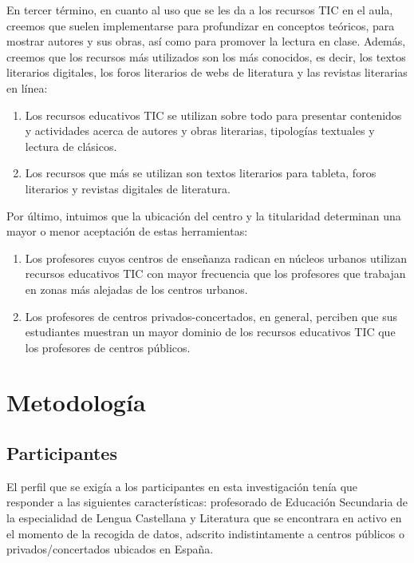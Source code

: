 \documentclass[spanish]{textolivre}
\begin{document}
En tercer término, en cuanto al uso que se les da a los recursos TIC en el aula, creemos que suelen implementarse para profundizar en conceptos teóricos, para mostrar autores y sus obras, así como para promover la lectura en clase. Además, creemos que los recursos más utilizados son los más conocidos, es decir, los textos literarios digitales, los foros literarios de webs de literatura y las revistas literarias en línea: 

\begin{enumerate}[label={H\arabic*},resume]
    \item\label{H9} Los recursos educativos TIC se utilizan sobre todo para presentar contenidos y actividades acerca de autores y obras literarias, tipologías textuales y lectura de clásicos.
   \item\label{H10}  Los recursos que más se utilizan son textos literarios para tableta, foros literarios y revistas digitales de literatura.
\end{enumerate}

Por último, intuimos que la ubicación del centro y la titularidad determinan una mayor o menor aceptación de estas herramientas: 

\begin{enumerate}[label={H\arabic*},resume]
    \item\label{H11} Los profesores cuyos centros de enseñanza radican en núcleos urbanos utilizan recursos educativos TIC con mayor frecuencia que los profesores que trabajan en zonas más alejadas de los centros urbanos.
    \item\label{H12} Los profesores de centros privados-concertados, en general, perciben que sus estudiantes muestran un mayor dominio de los recursos educativos TIC que los profesores de centros públicos.
\end{enumerate}

\section{Metodología}\label{sec-normas}
\subsection{Participantes}\label{sec-normas}
El perfil que se exigía a los participantes en esta investigación tenía que responder a las siguientes características: profesorado de Educación Secundaria de la especialidad de Lengua Castellana y Literatura que se encontrara en activo en el momento de la recogida de datos, adscrito indistintamente a centros públicos o privados/concertados ubicados en España.
\end{document}

